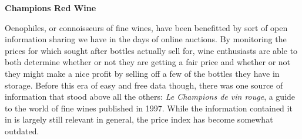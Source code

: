 \documentclass[addpoints]{examsetup}\usepackage[]{graphicx}\usepackage[]{color}
\begin{document}
\begin{questions}
\pagebreak


\question \textbf{Champions Red Wine}


Oenophiles, or connoisseurs of fine wines, have been benefitted by sort of open information sharing we have in the days of online auctions. 
By monitoring the prices for which sought after bottles actually sell for, wine enthusiasts are able to both determine whether or not they are getting a fair price and whether or not they might make a nice profit by selling off a few of the bottles they have in storage.
Before this era of easy and free data though, there was one source of information that stood above all the others: \textit{Le Champions de vin rouge}, a guide to the world of fine wines published in 1997.
While the information contained it in is largely still relevant in general, the price index has become somewhat outdated.


\end{questions}
\end{document}
